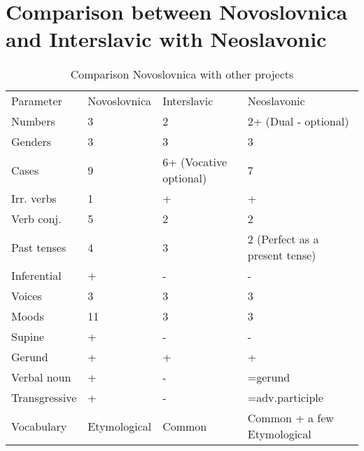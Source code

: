 \section{Comparison between Novoslovnica and Interslavic with Neoslavonic}



\begin{table}[!htb]
	\caption{Comparison Novoslovnica with other projects}
	\begin{tabular}{lp{5em}p{5em}p{5em}}
		Parameter & Novoslovnica & Interslavic & Neoslavonic \\
		Numbers & 3 & 2 & 2+ (Dual - optional) \\
		Genders & 3 & 3 & 3 \\
		Cases & 9 & 6+ (Vocative optional) & 7 \\
		Irr. verbs & 1 & + & + \\
		Verb conj. & 5 & 2 & 2 \\
		Past tenses & 4 & 3 & 2 (Perfect as a present tense)\\
		Inferential & + & - & - \\
		Voices & 3 & 3 & 3 \\
		Moods & 11 & 3 & 3 \\
		Supine & + & - & - \\
		Gerund & + & + & + \\
		Verbal noun & + & - & =gerund \\
		Transgressive & + & - & =adv.participle \\
		Vocabulary & Etymological & Common & Common + a few Etymological 
	\end{tabular}
\end{table}
